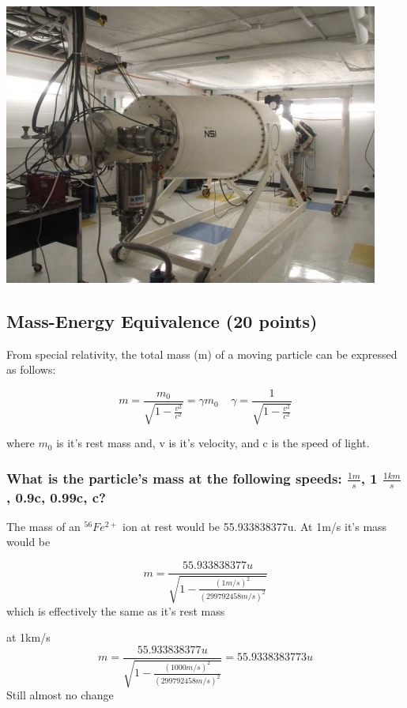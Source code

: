 \documentclass{article}
\begin{document}
\begin{center}
    \includegraphics[scale=0.5]{dante.png}
\end{center}




\subsection{Mass-Energy Equivalence (20 points)}
From special relativity, the total mass (m) of a moving particle can be expressed as follows:

$$m = \frac{m_0}{\sqrt{1-\frac{v^2}{c^2}}}= \gamma m_0 \ \ \ \ \ \gamma = \frac{1}{\sqrt{1-\frac{v^2}{c^2}}}$$

where $m_0$ is it's rest mass and, v is it's velocity, and c is the speed of light.

\subsubsection{What is the particle's mass at the following speeds:  $\frac{1m}{s}$, 1 $\frac{1km}{s}$, 0.9c, 0.99c, c?}\vspace{10pt}

The mass of an $^{56}Fe^{2+}$ ion at rest would be 55.933838377u. At 1m/s it's mass would be \vspace{10pt}

$$m = \frac{55.933838377u}{\sqrt{1-\frac{(1m/s)^2}{(299792458m/s)^2}}}$$ which is effectively the same as it's rest mass\vspace{10pt}

at 1km/s
$$m = \frac{55.933838377u}{\sqrt{1-\frac{(1000m/s)^2}{(299792458m/s)^2}}}=55.9338383773u$$
Still almost no change\vspace{10pt}
\end{document}

